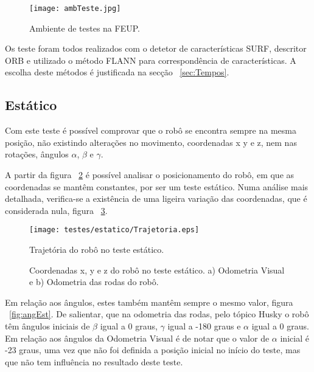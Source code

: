 \begin{figure}[h!] 
	\begin{center}
		\leavevmode		
		\texttt{[image: ambTeste.jpg]}
		\caption{Ambiente de testes na FEUP.}
		\label{fig:ambTeste}
	\end{center}
\end{figure}


Os teste foram todos realizados com o detetor de características SURF, descritor ORB e utilizado o método FLANN para correspondência de características. A escolha deste métodos é justificada na secção ~\ref{sec:Tempos}.


\subsection{Estático}\label{subsubsection:Estatico}

Com este teste é possível comprovar que o robô se encontra sempre na mesma posição, não existindo alterações no movimento, coordenadas x y e z, nem nas rotações, ângulos $\alpha$, $\beta$ e $\gamma$.



A partir da figura ~\ref{fig:trajRoboEst}  é possível analisar o posicionamento do robô, em que as coordenadas se  mantêm constantes, por ser um teste estático. Numa análise mais detalhada, verifica-se a existência de uma ligeira variação das coordenadas, que é considerada nula, figura ~\ref{fig:posEst}.


\begin{figure}[!htbp]
	\begin{center}
		\leavevmode		
		\texttt{[image: testes/estatico/Trajetoria.eps]}
		\caption{Trajetória do robô no teste estático.}
		\label{fig:trajRoboEst}
	\end{center}
\end{figure}



\begin{figure}[!htbp]
	\centering
	\qquad
	\caption{Coordenadas x, y e z do robô no teste estático. a) Odometria Visual e b) Odometria das rodas do robô.}
	\label{fig:posEst}
\end{figure}

Em relação aos ângulos, estes também mantêm sempre o mesmo valor, figura ~\ref{fig:angEst}. De salientar, que na odometria das rodas, pelo tópico Husky o robô têm ângulos iniciais de  $\beta$ igual a 0 graus, $\gamma$ igual a -180 graus e $\alpha$ igual a 0 graus. Em relação aos ângulos da Odometria Visual é de notar que o valor de  $\alpha$ inicial é -23 graus, uma vez que não foi definida a posição inicial no início do teste, mas que não tem influência no resultado deste teste.

